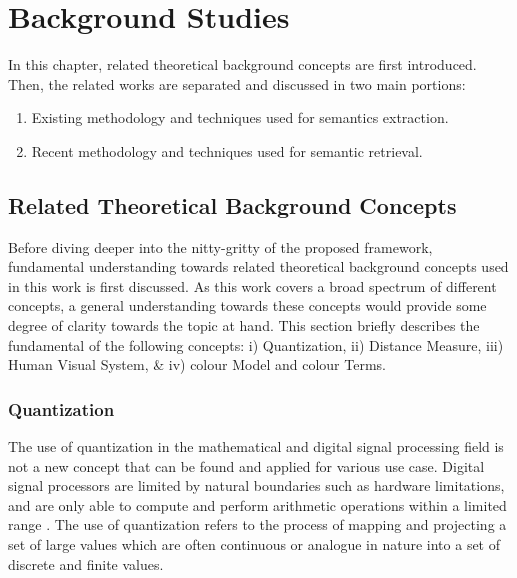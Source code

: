 


\chapter{Background Studies}
\label{section:litreview}

In this chapter, related theoretical background concepts are first introduced. Then, the related works are separated and discussed in two main portions:
\begin{enumerate}
    \item Existing methodology and techniques used for semantics extraction.
    \item Recent methodology and techniques used for semantic retrieval.
\end{enumerate}



\section{Related Theoretical Background Concepts}
\label{subsec:relatedConcepts}

Before diving deeper into the nitty-gritty of the proposed framework, fundamental understanding towards related theoretical background concepts used in this work is first discussed. As this work covers a broad spectrum of different concepts, a general understanding towards these concepts would provide some degree of clarity towards the topic at hand. This section briefly describes the fundamental of the following concepts: i) Quantization, ii) Distance Measure, iii) Human Visual System, \& iv) colour Model and colour Terms.


\subsection{Quantization}

The use of quantization in the mathematical and digital signal processing field is not a new concept that can be found and applied for various use case. Digital signal processors are limited by natural boundaries such as hardware limitations, and are only able to compute and perform arithmetic operations within a limited range \cite{spors_2018}. The use of quantization refers to the process of mapping and projecting a set of large values which are often continuous or analogue in nature into a set of discrete and finite values.

